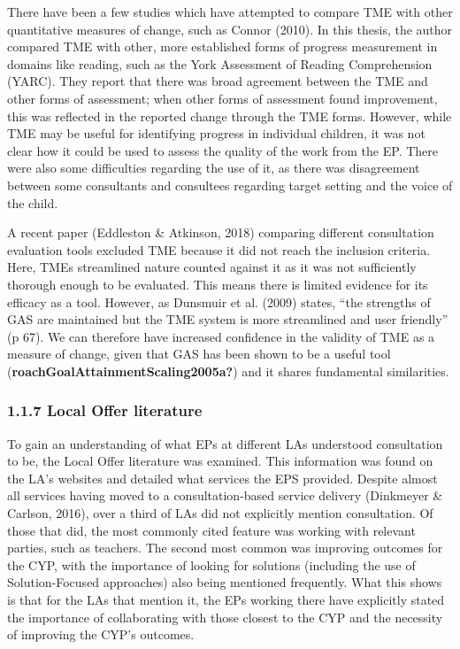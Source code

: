 \documentclass[
  english,
  man]{apa}
\begin{document}
There have been a few studies which have attempted to compare TME with other quantitative measures of change, such as Connor (2010). In this thesis, the author compared TME with other, more established forms of progress measurement in domains like reading, such as the York Assessment of Reading Comprehension (YARC). They report that there was broad agreement between the TME and other forms of assessment; when other forms of assessment found improvement, this was reflected in the reported change through the TME forms. However, while TME may be useful for identifying progress in individual children, it was not clear how it could be used to assess the quality of the work from the EP. There were also some difficulties regarding the use of it, as there was disagreement between some consultants and consultees regarding target setting and the voice of the child.

A recent paper (Eddleston \& Atkinson, 2018) comparing different consultation evaluation tools excluded TME because it did not reach the inclusion criteria. Here, TMEs streamlined nature counted against it as it was not sufficiently thorough enough to be evaluated. This means there is limited evidence for its efficacy as a tool. However, as Dunsmuir et al. (2009) states, ``the strengths of GAS are maintained but the TME system is more streamlined and user friendly'' (p 67). We can therefore have increased confidence in the validity of TME as a measure of change, given that GAS has been shown to be a useful tool (\textbf{roachGoalAttainmentScaling2005a?}) and it shares fundamental similarities.

\hypertarget{local-offer-literature}{%
\subsubsection{1.1.7 Local Offer literature}\label{local-offer-literature}}

To gain an understanding of what EPs at different LAs understood consultation to be, the Local Offer literature was examined. This information was found on the LA's websites and detailed what services the EPS provided. Despite almost all services having moved to a consultation-based service delivery (Dinkmeyer \& Carlson, 2016), over a third of LAs did not explicitly mention consultation. Of those that did, the most commonly cited feature was working with relevant parties, such as teachers. The second most common was improving outcomes for the CYP, with the importance of looking for solutions (including the use of Solution-Focused approaches) also being mentioned frequently. What this shows is that for the LAs that mention it, the EPs working there have explicitly stated the importance of collaborating with those closest to the CYP and the necessity of improving the CYP's outcomes.
\end{document}
